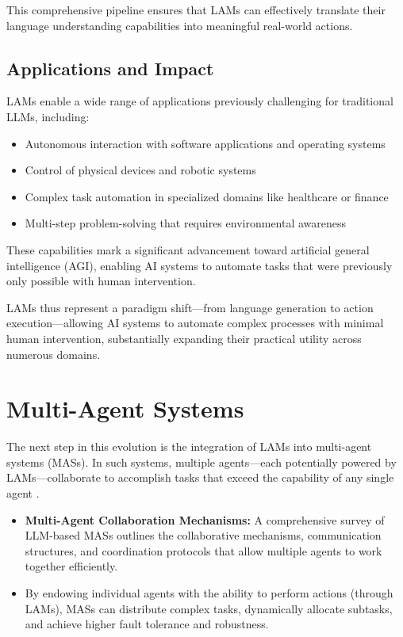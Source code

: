 \documentclass[journal,twoside,10pt]{IEEEtran}
\begin{document}
This comprehensive pipeline ensures that LAMs can effectively translate their language understanding capabilities into meaningful real-world actions.

\subsection{Applications and Impact}
LAMs enable a wide range of applications previously challenging for traditional LLMs, including:

\begin{itemize}
    \item Autonomous interaction with software applications and operating systems
    \item Control of physical devices and robotic systems
    \item Complex task automation in specialized domains like healthcare or finance
    \item Multi-step problem-solving that requires environmental awareness
\end{itemize}

These capabilities mark a significant advancement toward artificial general intelligence (AGI), enabling AI systems to automate tasks that were previously only possible with human intervention.

LAMs thus represent a paradigm shift—from language generation to action execution—allowing AI systems to automate complex processes with minimal human intervention, substantially expanding their practical utility across numerous domains.

\section{Multi-Agent Systems}
The next step in this evolution is the integration of LAMs into multi-agent systems (MASs). In such systems, multiple agents—each potentially powered by LAMs—collaborate to accomplish tasks that exceed the capability of any single agent \cite{mas_survey2023}.

\begin{itemize}
    \item \textbf{Multi-Agent Collaboration Mechanisms:} A comprehensive survey of LLM-based MASs outlines the collaborative mechanisms, communication structures, and coordination protocols that allow multiple agents to work together efficiently.
    \item By endowing individual agents with the ability to perform actions (through LAMs), MASs can distribute complex tasks, dynamically allocate subtasks, and achieve higher fault tolerance and robustness.
\end{itemize}
\end{document}
